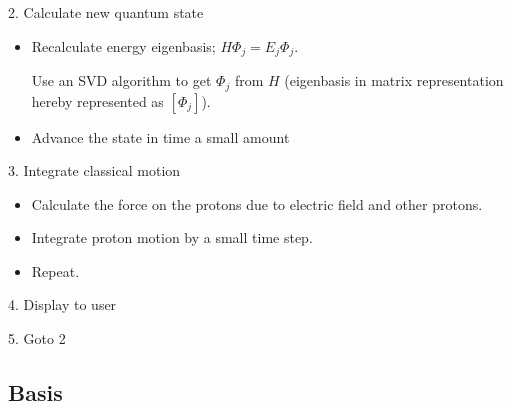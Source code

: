 \documentclass[12pt]{article}
\newcommand{\eigbasis}[0]{[\Phi_j]}
\begin{document}
2. Calculate new quantum state
\begin{itemize}
    \item Recalculate energy eigenbasis; $H\Phi_j = E_j\Phi_j$.

        Use an SVD algorithm to get $\Phi_j$ from $H$ (eigenbasis in matrix representation hereby represented as $\eigbasis$).
    \item Advance the state in time a small amount
\end{itemize}

3. Integrate classical motion
\begin{itemize}
    \item Calculate the force on the protons due to electric field and other protons.

    \item Integrate proton motion by a small time step.
    \item Repeat.
\end{itemize}

4. Display to user

5. Goto 2

\subsection{Basis}
\end{document}
